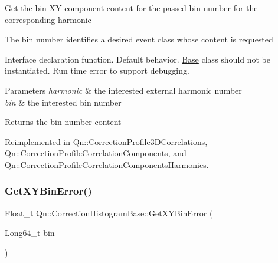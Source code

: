 Get the bin XY component content for the passed bin number for the corresponding harmonic

The bin number identifies a desired event class whose content is requested

Interface declaration function. Default behavior. \mbox{\hyperlink{classBase}{Base}} class should not be instantiated. Run time error to support debugging.


\begin{DoxyParams}{Parameters}
{\em harmonic} & the interested external harmonic number \\
\hline
{\em bin} & the interested bin number \\
\hline
\end{DoxyParams}
\begin{DoxyReturn}{Returns}
the bin number content 
\end{DoxyReturn}


Reimplemented in \mbox{\hyperlink{classQn_1_1CorrectionProfile3DCorrelations_a4471deccdf29c330cdbbbbb47d949d08}{Qn\+::\+Correction\+Profile3\+D\+Correlations}}, \mbox{\hyperlink{classQn_1_1CorrectionProfileCorrelationComponents_aec422c5e452b98fed97dbe57f8613314}{Qn\+::\+Correction\+Profile\+Correlation\+Components}}, and \mbox{\hyperlink{classQn_1_1CorrectionProfileCorrelationComponentsHarmonics_af7d5feb2bafb19417950f6d16cdfceb0}{Qn\+::\+Correction\+Profile\+Correlation\+Components\+Harmonics}}.

\mbox{\label{classQn_1_1CorrectionHistogramBase_ae7dada656dda33ba9adca7bcbd78f4d2}} 
\subsubsection{\texorpdfstring{Get\+X\+Y\+Bin\+Error()}{GetXYBinError()}\hspace{0.1cm}{\footnotesize\ttfamily [1/2]}}
{\footnotesize\ttfamily Float\+\_\+t Qn\+::\+Correction\+Histogram\+Base\+::\+Get\+X\+Y\+Bin\+Error (\begin{DoxyParamCaption}\item[{Long64\+\_\+t}]{bin }\end{DoxyParamCaption})\hspace{0.3cm}{\ttfamily [virtual]}}

